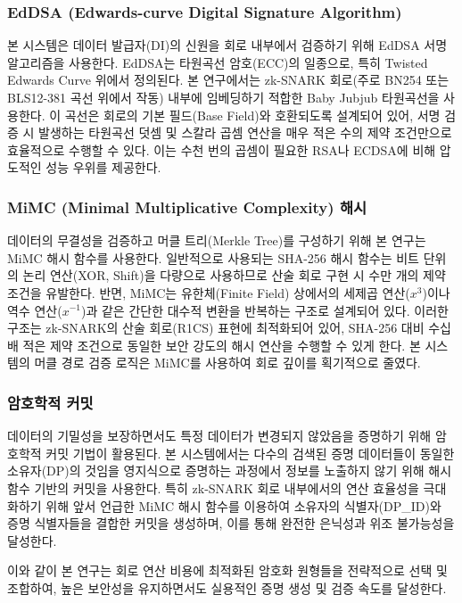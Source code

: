 \subsubsection{EdDSA (Edwards-curve Digital Signature Algorithm)} 
본 시스템은 데이터 발급자(DI)의 신원을 회로 내부에서 검증하기 위해 EdDSA 서명 알고리즘을 사용한다. EdDSA는 타원곡선 암호(ECC)의 일종으로, 특히 Twisted Edwards Curve 위에서 정의된다. 본 연구에서는 zk-SNARK 회로(주로 BN254 또는 BLS12-381 곡선 위에서 작동) 내부에 임베딩하기 적합한 Baby Jubjub 타원곡선을 사용한다. 이 곡선은 회로의 기본 필드(Base Field)와 호환되도록 설계되어 있어, 서명 검증 시 발생하는 타원곡선 덧셈 및 스칼라 곱셈 연산을 매우 적은 수의 제약 조건만으로 효율적으로 수행할 수 있다. 이는 수천 번의 곱셈이 필요한 RSA나 ECDSA에 비해 압도적인 성능 우위를 제공한다.

\subsubsection{MiMC (Minimal Multiplicative Complexity) 해시} 
데이터의 무결성을 검증하고 머클 트리(Merkle Tree)를 구성하기 위해 본 연구는 MiMC 해시 함수를 사용한다. 일반적으로 사용되는 SHA-256 해시 함수는 비트 단위의 논리 연산(XOR, Shift)을 다량으로 사용하므로 산술 회로 구현 시 수만 개의 제약 조건을 유발한다. 반면, MiMC는 유한체(Finite Field) 상에서의 세제곱 연산($x^3$)이나 역수 연산($x^{-1}$)과 같은 간단한 대수적 변환을 반복하는 구조로 설계되어 있다. 이러한 구조는 zk-SNARK의 산술 회로(R1CS) 표현에 최적화되어 있어, SHA-256 대비 수십 배 적은 제약 조건으로 동일한 보안 강도의 해시 연산을 수행할 수 있게 한다. 본 시스템의 머클 경로 검증 로직은 MiMC를 사용하여 회로 깊이를 획기적으로 줄였다.

\subsubsection{암호학적 커밋} 
데이터의 기밀성을 보장하면서도 특정 데이터가 변경되지 않았음을 증명하기 위해 암호학적 커밋 기법이 활용된다. 본 시스템에서는 다수의 검색된 증명 데이터들이 동일한 소유자(DP)의 것임을 영지식으로 증명하는 과정에서 정보를 노출하지 않기 위해 해시 함수 기반의 커밋을 사용한다. 특히 zk-SNARK 회로 내부에서의 연산 효율성을 극대화하기 위해 앞서 언급한 MiMC 해시 함수를 이용하여 소유자의 식별자(DP\_ID)와 증명 식별자들을 결합한 커밋을 생성하며, 이를 통해 완전한 은닉성과 위조 불가능성을 달성한다.

\bigskip

이와 같이 본 연구는 회로 연산 비용에 최적화된 암호화 원형들을 전략적으로 선택 및 조합하여, 높은 보안성을 유지하면서도 실용적인 증명 생성 및 검증 속도를 달성한다.
